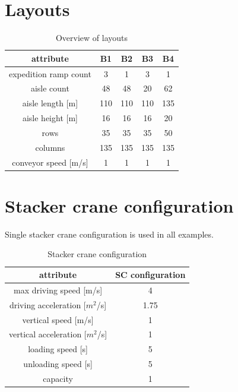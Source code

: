 \documentclass{ctuthesis}
\begin{document}
\section{Layouts}

\begin{table}[H]
\begin{tabular}{ |c|| c | c | c | c |} 
\hline
attribute & B1 & B2 & B3 & B4\\ 
\hline
expedition ramp count & 3 & 1 & 3 & 1 \\
\hline
aisle count & 48 & 48 & 20 & 62\\
\hline
aisle length [m] &  110 & 110 & 110 & 135\\
\hline
aisle height [m] & 16 & 16 & 16 & 20\\
\hline
rows & 35 & 35 & 35 & 50\\ 
\hline
columns & 135 & 135 & 135 & 135\\ 
\hline
conveyor speed [m/s] & 1 & 1 & 1 & 1\\ 
\hline
\end{tabular}
\caption{Overview of layouts} \label{tab:layoutoverview}
\end{table}

\section{Stacker crane configuration}

Single stacker crane configuration is used in all examples.

\begin{table}[H]
\begin{tabular}{ |c|| c |} 
\hline
attribute & SC configuration\\ 
\hline
max driving speed [m/s] & 4  \\
\hline
driving acceleration [$m^2$/s] & 1.75\\
\hline
vertical speed [m/s] & 1\\
\hline
vertical acceleration [$m^2$/s] & 1\\
\hline
loading speed [s] & 5\\ 
\hline
unloading speed [s] & 5\\ 
\hline
capacity & 1\\ 
\hline
\end{tabular}
\caption{Stacker crane configuration} \label{tab:scconf}
\end{table}
\end{document}
